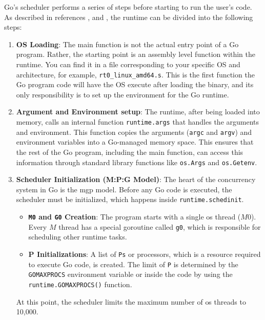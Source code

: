 Go's scheduler performs a series of steps before starting to run the user's code. As described in references \cite{go:GoLabConf-runtime}, \cite{go:ardanlabs-runtime} and \cite{go:memory-allocation}, the runtime can be divided into the following steps:
\begin{enumerate}
    \item \textbf{OS Loading}:
    The main function is not the actual entry point of a Go program. Rather, the starting point is an assembly level function within the runtime. You can find it in a file corresponding to your specific OS and architecture, for example, \texttt{rt0\_linux\_amd64.s}. This is the first function the Go program code will have the OS execute after loading the binary, and its only responsibility is to set up the environment for the Go runtime.

    \item \textbf{Argument and Environment setup}:
        The runtime, after being loaded into memory, calls an internal function \texttt{runtime.args} that handles the arguments and environment. This function copies the arguments (\texttt{argc} and \texttt{argv}) and environment variables into a Go-managed memory space. This ensures that the rest of the Go program, including the main function, can access this information through standard library functions like \texttt{os.Args} and \texttt{os.Getenv}.
    \item \textbf{Scheduler Initialization (M:P:G Model)}:
        The heart of the concurrency system in Go is the \gls{mgp} model. Before any Go code is executed, the scheduler must be initialized, which happens inside \texttt{runtime.schedinit}.
        \begin{itemize}
            \item \textbf{\texttt{M0} and \texttt{G0} Creation}: The program starts with a single \gls{os} thread ($M0$). Every $M$ thread has a special \gls{goroutine} called \texttt{g0}, which is responsible for scheduling other runtime tasks.
            \item \textbf{P Initializations}: A list of \texttt{Ps} or processors, which is a resource required to execute Go code, is created. The limit of \texttt{P} is determined by the \texttt{GOMAXPROCS} environment variable or inside the  code by using the \texttt{runtime.GOMAXPROCS()} function.
        \end{itemize}
        At this point, the scheduler limits the maximum number of \gls{os} threads to 10,000.


\end{enumerate}
